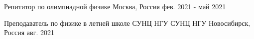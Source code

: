 

\begin{cventries}


  
  \cventry
    {Репититор по олимпиадной физике} %
    {} %
    {Москва, Россия} %
    {фев. 2021 - май 2021} %
    {}

  \cventry
  {Преподаватель по физике в летней школе СУНЦ НГУ}
  {СУНЦ НГУ}
  {Новосибирск, Россия}
  {авг. 2021}
  {}
    
\end{cventries}
